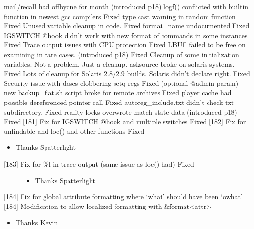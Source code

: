 \documentclass[letterpaper,10pt,english]{sphinxmanual}
\begin{document}
\sphinxAtStartPar
mail/recall had off\sphinxhyphen{}by\sphinxhyphen{}one for month (introduced p18)
logf() conflicted with built\sphinxhyphen{}in function in newest gcc compilers \sphinxhyphen{} Fixed
type cast warning in random function \sphinxhyphen{} Fixed
Unused variable cleanup in code. \sphinxhyphen{} Fixed
format\_name undocumented \sphinxhyphen{} Fixed
IGSWITCH @hook didn’t work with new format of commands in some instances \sphinxhyphen{} Fixed
Trace output issues with CPU protection \sphinxhyphen{} Fixed
LBUF failed to be free on examining in rare cases. (introduced p18) \sphinxhyphen{} Fixed
Cleanup of some initialization variables.  Not a problem.  Just a cleanup.
asksource broke on solaris systems. \sphinxhyphen{} Fixed
Lots of cleanup for Solaris 2.8/2.9 builds.  Solaris didn’t declare right. \sphinxhyphen{} Fixed
Security issue with descs clobbering setq regs \sphinxhyphen{} Fixed (optional @admin param)
new backup\_flat.sh script broke for remote archives \sphinxhyphen{} Fixed
player cache had possible dereferenced pointer call \sphinxhyphen{} Fixed
autoreg\_include.txt didn’t check txt subdirectory. \sphinxhyphen{} Fixed
reality locks overwrote match state data (introduced p18) \sphinxhyphen{} Fixed
{[}18\sphinxhyphen{}1{]} Fix for IGSWITCH @hook and multiple switches \sphinxhyphen{} Fixed
{[}18\sphinxhyphen{}2{]} Fix for unfindable and loc() and other functions \sphinxhyphen{} Fixed
\begin{itemize}
\item {} 
\sphinxAtStartPar
Thanks Spatterlight

\end{itemize}
\begin{description}
\item[{{[}18\sphinxhyphen{}3{]} Fix for \%l in trace output (same issue as loc() had) \sphinxhyphen{} Fixed}] \leavevmode\begin{itemize}
\item {} 
\sphinxAtStartPar
Thanks Spatterlight

\end{itemize}

\end{description}

\sphinxAtStartPar
{[}18\sphinxhyphen{}4{]} Fix for global attribute formatting where ‘what’ should have been ‘owhat’
{[}18\sphinxhyphen{}4{]} Modification to allow localized formatting with \&format\textless{}attr\textgreater{}
\begin{itemize}
\item {} 
\sphinxAtStartPar
Thanks Kevin

\end{itemize}
\end{document}
